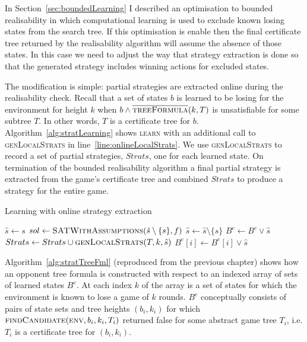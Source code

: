 In Section~\ref{sec:boundedLearning} I described an optimisation to bounded realisability in which computational learning is used to exclude known losing states from the search tree. If this optimisation is enable then the final certificate tree returned by the realisability algorithm will assume the absence of those states. In this case we need to adjust the way that strategy extraction is done so that the generated strategy includes winning actions for excluded states. 

The modification is simple: partial strategies are extracted online during the realisability check. Recall that a set of states $b$ is learned to be losing for the environment for height $k$ when $b \land \textsc{$\overline{\mbox{treeFormula}}$}(k, T)$ is unsatisfiable for some subtree $T$. In other words, $T$ is a certificate tree for $b$. Algorithm~\ref{alg:stratLearning} shows \textsc{learn} with an additional call to \textsc{genLocalStrats} in line~\ref{line:onlineLocalStrats}.  We use \textsc{genLocalStrats} to record a set of partial strategies, $Strats$, one for each learned state. On termination of the bounded realisability algorithm a final partial strategy is extracted from the game's certificate tree and combined $Strats$ to produce a strategy for the entire game.

\begin{algorithm}
    \caption{Learning with online strategy extraction}
    \label{alg:stratLearning}
    \begin{algorithmic}
            \State $ \hat{s} \gets s$
            \State $sol \gets \Call{SATWithAssumptions}{\hat{s} \setminus \{ s \}, f}$
                    \State $\hat{s} \gets \hat{s} \setminus \{ s \}$
                \EndIf
            \EndFor
                \State $B^c \gets B^c \lor \hat{s}$
            \Else
                \State $Strats \gets Strats \cup \Call{genLocalStrats}{T, k, \hat{s}}$ \label{line:onlineLocalStrats}
                    \State $B^e[i] \gets B^e[i] \lor \hat{s}$
                \EndFor
            \EndIf
        \EndFunction
    \end{algorithmic}
\end{algorithm}

Algorithm~\ref{alg:stratTreeFml} (reproduced from the previous chapter) shows how an opponent tree formula is constructed with respect to an indexed array of sets of learned states $B^e$. At each index $k$ of the array is a set of states for which the environment is known to lose a game of $k$ rounds. $B^e$ conceptually consists of pairs of state sets and tree heights $(b_i, k_i)$ for which $\textsc{findCandidate}(\textsc{env}, b_i, k_i, T_i)$ returned false for some abstract game tree $T_i$, i.e. $T_i$ is a certificate tree for $(b_i, k_i)$.

